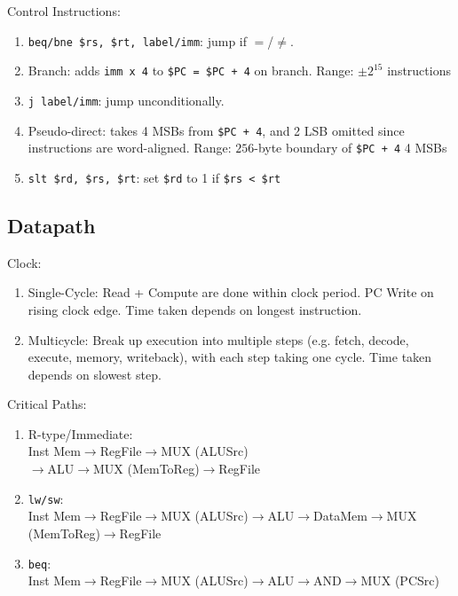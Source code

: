 \documentclass[12pt, a4paper]{article}
\begin{document}
\begin{multicols*}{3}
Control Instructions:
\begin{enumerate}[\roman*.]
  \item \lstinline|beq/bne $rs, $rt, label/imm|: jump if $=$/$\neq$.
  \item Branch: adds \lstinline|imm x 4| to \lstinline|$PC = $PC + 4| on branch. Range: $\pm 2^{15}$ instructions
  \item \lstinline|j label/imm|: jump unconditionally.
  \item Pseudo-direct: takes 4 MSBs from \lstinline|$PC + 4|, and 2 LSB omitted since instructions are word-aligned. Range: $256$-byte boundary of \lstinline|$PC + 4| 4 MSBs
  \item \lstinline|slt $rd, $rs, $rt|: set \lstinline|$rd| to 1 if \lstinline|$rs < $rt|
\end{enumerate}
\colbreak

\subsection{Datapath}

Clock:
\begin{enumerate}[\roman*.]
  \item Single-Cycle: Read + Compute are done within clock period. PC Write on rising clock edge. Time taken depends on longest instruction.
  \item Multicycle: Break up execution into multiple steps (e.g. fetch, decode, execute, memory, writeback), with each step taking one cycle. Time taken depends on slowest step.\\
\end{enumerate}

Critical Paths:
\begin{enumerate}[\roman*.]
  \item R-type/Immediate:\\
    Inst Mem$\rightarrow$RegFile$\rightarrow$MUX (ALUSrc)\\$\rightarrow$ALU$\rightarrow$MUX (MemToReg)$\rightarrow$RegFile
  \item \lstinline|lw/sw|:\\
    Inst Mem$\rightarrow$RegFile$\rightarrow$MUX (ALUSrc)$\rightarrow$ALU$\rightarrow$DataMem$\rightarrow$MUX (MemToReg)$\rightarrow$RegFile
  \item \lstinline|beq|:\\
    Inst Mem$\rightarrow$RegFile$\rightarrow$MUX (ALUSrc)$\rightarrow$ALU$\rightarrow$AND$\rightarrow$MUX (PCSrc)
\end{enumerate}


\end{multicols*}
\end{document}
